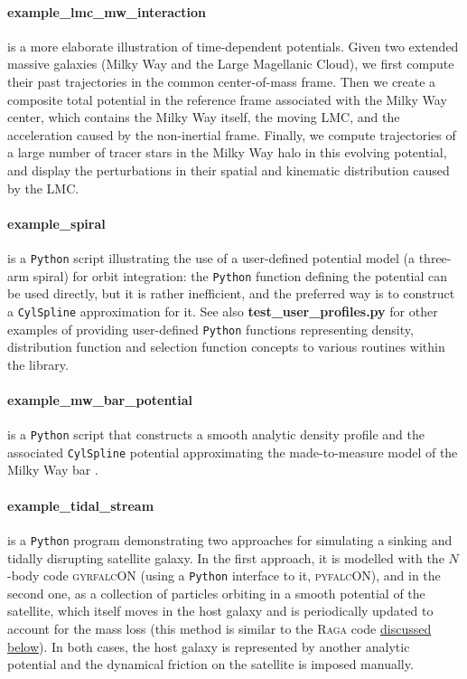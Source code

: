 \documentclass[12pt]{article}
\newcommand{\Python}{\texttt{Python}\xspace}
\newcommand{\ppp}[1]{\textcolor{darkolive} {\texttt{#1}}}
\begin{document}
\paragraph{example_lmc_mw_interaction} is a more elaborate illustration of time-dependent potentials. Given two extended massive galaxies (Milky Way and the Large Magellanic Cloud), we first compute their past trajectories in the common center-of-mass frame. Then we create a composite total potential in the reference frame associated with the Milky Way center, which contains the Milky Way itself, the moving LMC, and the acceleration caused by the non-inertial frame. Finally, we compute trajectories of a large number of tracer stars in the Milky Way halo in this evolving potential, and display the perturbations in their spatial and kinematic distribution caused by the LMC.

\paragraph{example_spiral} \label{sec:ExampleSpiral} is a \Python script illustrating the use of a user-defined potential model (a three-arm spiral) for orbit integration: the \Python function defining the potential can be used directly, but it is rather inefficient, and the preferred way is to construct a \ppp{CylSpline} approximation for it. See also \textbf{test\_user\_profiles.py} for other examples of providing user-defined \Python functions representing density, distribution function and selection function concepts to various routines within the library.

\paragraph{example_mw_bar_potential} is a \Python script that constructs a smooth analytic density profile and the associated \ppp{CylSpline} potential approximating the made-to-measure model of the Milky Way bar \cite{Portail2017}.

\paragraph{example_tidal_stream} is a \Python program demonstrating two approaches for simulating a sinking and tidally disrupting satellite galaxy. In the first approach, it is modelled with the $N$-body code \textsc{gyrfalcON} (using a \Python interface to it, \textsc{pyfalcON}), and in the second one, as a collection of particles orbiting in a smooth potential of the satellite, which itself moves in the host galaxy and is periodically updated to account for the mass loss (this method is similar to the \textsc{Raga} code \hyperref[sec:raga]{discussed below}). In both cases, the host galaxy is represented by another analytic potential and the dynamical friction on the satellite is imposed manually.
\end{document}
